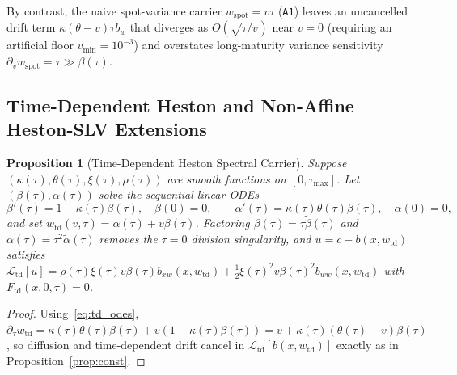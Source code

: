\documentclass[11pt,a4paper]{article}
\newtheorem{proposition}{Proposition}
\begin{document}
By contrast, the naive spot-variance carrier $w_{\mathrm{spot}} = v\tau$ (\texttt{A1}) leaves an uncancelled drift term $\kappa(\theta - v)\tau b_w$ that diverges as $O(\sqrt{\tau/v})$ near $v = 0$ (requiring an artificial floor $v_{\min} = 10^{-3}$) and overstates long-maturity variance sensitivity $\partial_v w_{\mathrm{spot}} = \tau \gg \beta(\tau)$.

\subsection{Time-Dependent Heston and Non-Affine Heston-SLV Extensions}

\begin{proposition}[Time-Dependent Heston Spectral Carrier]
\label{prop:td}
Suppose $(\kappa(\tau), \theta(\tau), \xi(\tau), \rho(\tau))$ are smooth functions on $[0, \tau_{\max}]$. Let $(\beta(\tau), \alpha(\tau))$ solve the sequential linear ODEs
\begin{equation}
  \beta'(\tau) = 1 - \kappa(\tau)\beta(\tau), \quad \beta(0) = 0, \qquad \alpha'(\tau) = \kappa(\tau)\theta(\tau)\beta(\tau), \quad \alpha(0) = 0,
  \label{eq:td_odes}
\end{equation}
and set $w_{\mathrm{td}}(v, \tau) = \alpha(\tau) + v\beta(\tau)$. Factoring $\beta(\tau) = \tau\tilde{\beta}(\tau)$ and $\alpha(\tau) = \tau^2\tilde{\alpha}(\tau)$ removes the $\tau = 0$ division singularity, and $u = c - b(x, w_{\mathrm{td}})$ satisfies $\mathcal{L}_{\mathrm{td}}[u] = \rho(\tau)\xi(\tau)v\beta(\tau)b_{xw}(x, w_{\mathrm{td}}) + \frac{1}{2}\xi(\tau)^2 v\beta(\tau)^2 b_{ww}(x, w_{\mathrm{td}})$ with $F_{\mathrm{td}}(x, 0, \tau) = 0$.
\end{proposition}
\begin{proof}
Using~\eqref{eq:td_odes}, $\partial_\tau w_{\mathrm{td}} = \kappa(\tau)\theta(\tau)\beta(\tau) + v(1 - \kappa(\tau)\beta(\tau)) = v + \kappa(\tau)(\theta(\tau) - v)\beta(\tau)$, so diffusion and time-dependent drift cancel in $\mathcal{L}_{\mathrm{td}}[b(x, w_{\mathrm{td}})]$ exactly as in Proposition~\ref{prop:const}.
\end{proof}
\end{document}
